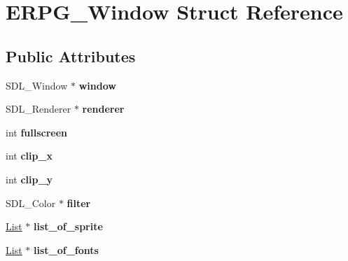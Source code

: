 \hypertarget{structERPG__Window}{\section{E\-R\-P\-G\-\_\-\-Window Struct Reference}
\label{structERPG__Window}
}
\subsection*{Public Attributes}
\begin{DoxyCompactItemize}
\item 
\hypertarget{structERPG__Window_a6029e53e6a9963c5fa9878b92911d7ee}{S\-D\-L\-\_\-\-Window $\ast$ {\bfseries window}}\label{structERPG__Window_a6029e53e6a9963c5fa9878b92911d7ee}

\item 
\hypertarget{structERPG__Window_a8c8ef89b8e19ecccce39fe55280b4c44}{S\-D\-L\-\_\-\-Renderer $\ast$ {\bfseries renderer}}\label{structERPG__Window_a8c8ef89b8e19ecccce39fe55280b4c44}

\item 
\hypertarget{structERPG__Window_a39d3a0e66bbbb33bb4d7a80df21e4181}{int {\bfseries fullscreen}}\label{structERPG__Window_a39d3a0e66bbbb33bb4d7a80df21e4181}

\item 
\hypertarget{structERPG__Window_a4a5be7110eb1f4a2692a3954c024faee}{int {\bfseries clip\-\_\-x}}\label{structERPG__Window_a4a5be7110eb1f4a2692a3954c024faee}

\item 
\hypertarget{structERPG__Window_a8ac755251ba8dc9c14e81008855684f1}{int {\bfseries clip\-\_\-y}}\label{structERPG__Window_a8ac755251ba8dc9c14e81008855684f1}

\item 
\hypertarget{structERPG__Window_aada00e7553becef63c38e8d831332403}{S\-D\-L\-\_\-\-Color $\ast$ {\bfseries filter}}\label{structERPG__Window_aada00e7553becef63c38e8d831332403}

\item 
\hypertarget{structERPG__Window_abb9a7179039405d5c46ae2c7f03946dc}{\hyperlink{structList}{List} $\ast$ {\bfseries list\-\_\-of\-\_\-sprite}}\label{structERPG__Window_abb9a7179039405d5c46ae2c7f03946dc}

\item 
\hypertarget{structERPG__Window_a9e839dd38ebeeb771bbf217d7ff9ea32}{\hyperlink{structList}{List} $\ast$ {\bfseries list\-\_\-of\-\_\-fonts}}\label{structERPG__Window_a9e839dd38ebeeb771bbf217d7ff9ea32}


\end{DoxyCompactItemize}
